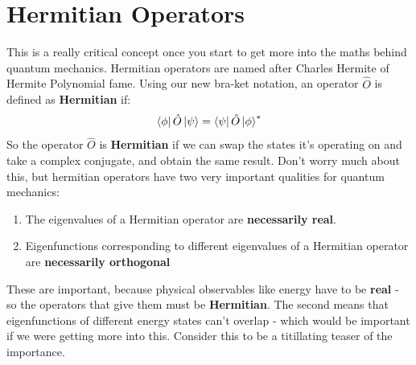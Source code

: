 \documentclass{memoir}[11pt,oneside,a4paper,openany]
\begin{document}
\section{Hermitian Operators}
This is a really critical concept once you start to get more into the maths behind quantum mechanics. Hermitian operators are named after Charles Hermite of Hermite Polynomial fame. Using our new bra-ket notation, an operator $\hat{O}$ is defined as \textbf{Hermitian} if:
\begin{equation}
	\bra{\phi}\hat{O}\ket{\psi} = \bra{\psi}\hat{O}\ket{\phi}^*
\end{equation}
So the operator $\hat{O}$ is \textbf{Hermitian} if we can swap the states it's operating on and take a complex conjugate, and obtain the same result. Don't worry much about this, but hermitian operators have two very important qualities for quantum mechanics:
\begin{enumerate}
	\item The eigenvalues of a Hermitian operator are \textbf{necessarily real}.
	\item Eigenfunctions corresponding to different eigenvalues of a Hermitian operator are \textbf{necessarily orthogonal}
\end{enumerate}
These are important, because physical observables like energy have to be \textbf{real} - so the operators that give them must be \textbf{Hermitian}. The second means that eigenfunctions of different energy states can't overlap - which would be important if we were getting more into this. Consider this to be a titillating teaser of the importance.
\end{document}
